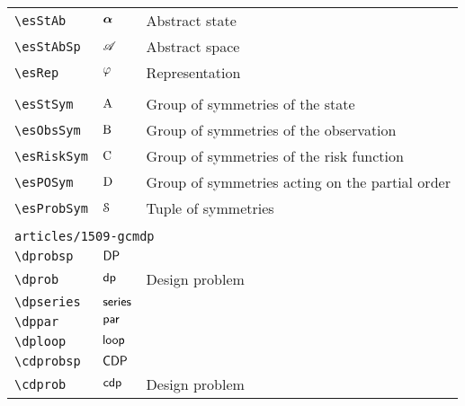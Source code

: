 \begin{longtable}{lll}
 \hline
{\color[rgb]{0.5,0.5,0.5}\texttt{\textbackslash esStAb}} & $\boldsymbol{\alpha}$ &  Abstract state\\ 
 {\color[rgb]{0.5,0.5,0.5}\texttt{\textbackslash esStAbSp}} & $\mathscr{A}$ &  Abstract space\\ 
 {\color[rgb]{0.5,0.5,0.5}\texttt{\textbackslash esRep}} & $\varphi$ &  Representation\\ 
  &  & {\setlength\fboxsep{1pt}%
\fbox{%
\color[rgb]{0.5,0.5,0.5}\begin{minipage}[]{8cm}%
$\esRep: \esSt \mapsto \esStAb$.\par%
{\small{\texttt{\$\textbackslash esRep: \textbackslash esSt \textbackslash mapsto \textbackslash esStAb\$.}}}\end{minipage}%
}%
}%
\\ 
 {\color[rgb]{0.5,0.5,0.5}\texttt{\textbackslash esStSym}} & $\mathrm{A}$ &  Group of symmetries of the state\\ 
 {\color[rgb]{0.5,0.5,0.5}\texttt{\textbackslash esObsSym}} & $\mathrm{B}$ &  Group of symmetries of the observation\\ 
 {\color[rgb]{0.5,0.5,0.5}\texttt{\textbackslash esRiskSym}} & $\mathrm{C}$ &  Group of symmetries of the risk function\\ 
 {\color[rgb]{0.5,0.5,0.5}\texttt{\textbackslash esPOSym}} & $\mathrm{D}$ &  Group of symmetries acting on the partial order\\ 
 {\color[rgb]{0.5,0.5,0.5}\texttt{\textbackslash esProbSym}} & $\mathcal{S}$ &  Tuple of symmetries\\ 
  &  & \\ 
 \multicolumn{3}{l}{{\color[rgb]{0.5,0.5,0.5}\texttt{articles/1509-gcmdp}} \emph{}}\\ 
 \hline
{\color[rgb]{0.5,0.5,0.5}\texttt{\textbackslash dprobsp}} & $\mathsf{DP}$ & \\ 
 {\color[rgb]{0.5,0.5,0.5}\texttt{\textbackslash dprob}} & $\mathsf{dp}$ &  Design problem\\ 
 {\color[rgb]{0.5,0.5,0.5}\texttt{\textbackslash dpseries}} & $\mathsf{series}$ & \\ 
 {\color[rgb]{0.5,0.5,0.5}\texttt{\textbackslash dppar}} & $\mathsf{par}$ & \\ 
 {\color[rgb]{0.5,0.5,0.5}\texttt{\textbackslash dploop}} & $\mathsf{loop}$ & \\ 
 {\color[rgb]{0.5,0.5,0.5}\texttt{\textbackslash cdprobsp}} & $\mathsf{CDP}$ & \\ 
 {\color[rgb]{0.5,0.5,0.5}\texttt{\textbackslash cdprob}} & $\mathsf{cdp}$ &  Design problem\\ 

\end{longtable}
